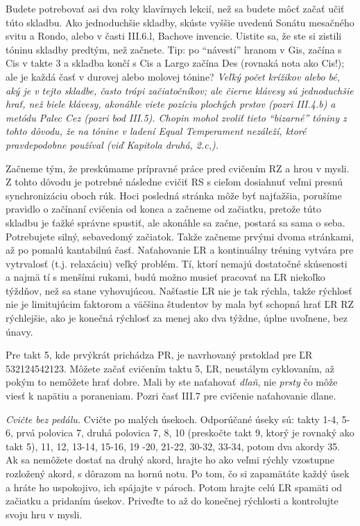 Budete potrebovať asi dva roky klavírnych lekcií, než sa budete môcť začať učiť túto skladbu.
Ako jednoduchšie skladby, skúste vyššie uvedenú Sonátu mesačného svitu a Rondo, alebo v časti III.6.l, Bachove invencie. Uistite sa, že ste si zistili tóninu skladby predtým, než začnete. Tip: po “návestí” hranom v Gis, začína s Cis v takte 3 a skladba končí s Cis a Largo začína Des (rovnaká nota ako Cis!); ale je každá časť v durovej alebo molovej tónine? \emph{Veľký počet krížikov alebo bé, aký je v tejto skladbe, často trápi začiatočníkov; ale čierne klávesy sú jednoduchšie hrať, než biele klávesy, akonáhle viete pozíciu plochých prstov (pozri III.4.b) a metódu Palec Cez (pozri bod III.5). Chopin mohol zvoliť tieto “bizarné” tóniny z tohto dôvodu, že na tónine v ladení Equal Temperament nezáleží, ktoré pravdepodobne používal (viď Kapitola druhá, 2.c,).}

Začneme tým, že preskúmame prípravné práce pred cvičením RZ a hrou v mysli. Z tohto dôvodu je potrebné následne cvičiť RS s cieľom dosiahnuť veľmi presnú synchronizáciu oboch rúk. Hoci posledná stránka môže byť najťažšia, porušíme pravidlo o začínaní cvičenia od konca a začneme od začiatku, pretože túto skladbu je ťažké správne spustiť, ale akonáhle sa začne, postará sa sama o seba. Potrebujete silný, sebavedomý začiatok. Takže začneme prvými dvoma stránkami, až po pomalú kantabilnú časť. Naťahovanie ĽR a kontinuálny tréning vytvára pre vytrvalosť (t.j. relaxáciu) veľký problém. Tí, ktorí nemajú dostatočné skúsenosti a najmä tí s menšími rukami, budú možno musieť pracovať na ĽR niekoľko týždňov, než sa stane vyhovujúcou. Našťastie ĽR nie je tak rýchla, takže rýchlosť nie je limitujúcim faktorom a väčšina študentov by mala byť schopná hrať ĽR RZ rýchlejšie, ako je konečná rýchlosť za menej ako dva týždne, úplne uvoľnene, bez únavy.

Pre takt 5, kde prvýkrát prichádza PR, je navrhovaný prstoklad pre ĽR 532124542123. Môžete začať cvičením taktu 5, ĽR, neustálym cyklovaním, až pokým to nemôžete hrať dobre. Mali by ste naťahovať \textit{dlaň}, nie \textit{prsty} čo môže viesť k napätiu a poraneniam. Pozri časť III.7 pre cvičenie naťahovanie dlane.

\emph{Cvičte bez pedálu.} Cvičte po malých úsekoch. Odporúčané úseky sú: takty 1-4, 5-6, prvá polovica 7, druhá polovica 7, 8, 10 (preskočte takt 9, ktorý je rovnaký ako takt 5), 11, 12, 13-14, 15-16, 19 -20, 21-22, 30-32, 33-34, potom dva akordy 35. Ak sa nemôžete dostať na druhý akord, hrajte ho ako veľmi rýchly vzostupne rozložený akord, s dôrazom na hornú notu. Po tom, čo si zapamätáte každý úsek a hráte ho uspokojivo, ich spájajte v pároch. Potom hrajte celú ĽR spamäti od začiatku a pridaním úsekov. Priveďte to až do konečnej rýchlosti a kontrolujte svoju hru v mysli.

